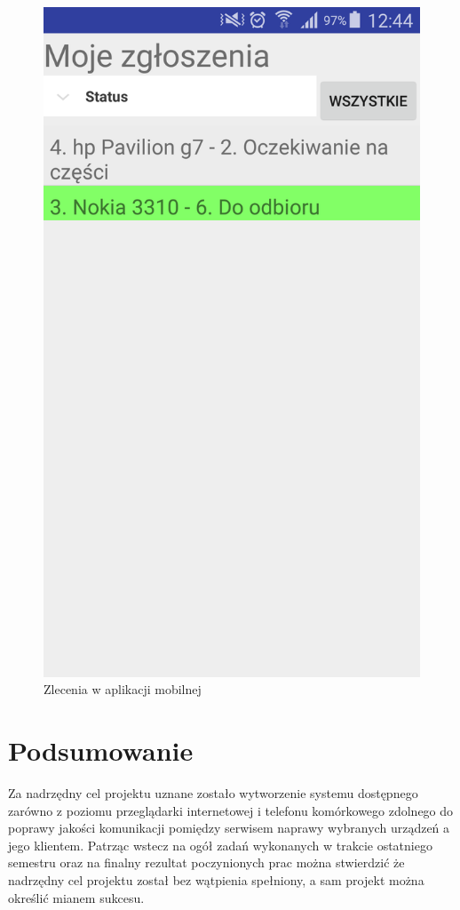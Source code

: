\documentclass[a4paper,11pt]{article}
\begin{document}
\begin{figure}[h!]
	\centering
	\includegraphics[width=\textwidth,height=0.6\textheight]{zleceniaMobile.png}
	\caption{Zlecenia w aplikacji mobilnej}
\end{figure}





\section{Podsumowanie}
Za nadrzędny cel projektu uznane zostało wytworzenie systemu dostępnego zarówno z poziomu przeglądarki internetowej i telefonu komórkowego zdolnego do poprawy jakości komunikacji pomiędzy serwisem naprawy wybranych urządzeń a jego klientem. Patrząc wstecz na ogół zadań wykonanych w trakcie ostatniego semestru oraz na finalny rezultat poczynionych prac można stwierdzić że nadrzędny cel projektu został bez wątpienia spełniony, a sam projekt można określić mianem sukcesu.
\end{document}
